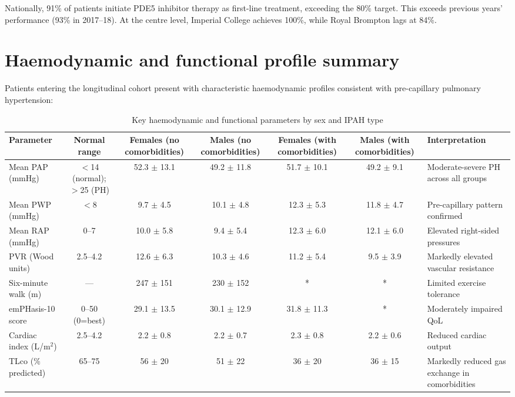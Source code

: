 \documentclass[11pt,a4paper]{article}
\begin{document}
Nationally, 91\% of patients initiate PDE5 inhibitor therapy as first-line treatment, exceeding the 80\% target. This exceeds previous years' performance (93\% in 2017--18). At the centre level, Imperial College achieves 100\%, while Royal Brompton lags at 84\%.

\section{Haemodynamic and functional profile summary}

Patients entering the longitudinal cohort present with characteristic haemodynamic profiles consistent with pre-capillary pulmonary hypertension:

\begin{table}[H]
\centering
\small
\caption{Key haemodynamic and functional parameters by sex and IPAH type}
\begin{tabularx}{\textwidth}{lcccccY}
\toprule
Parameter & Normal range & Females (no comorbidities) & Males (no comorbidities) & Females (with comorbidities) & Males (with comorbidities) & Interpretation \\
\midrule
Mean PAP (mmHg) & $<$14 (normal); $>$25 (PH) & 52.3 $\pm$ 13.1 & 49.2 $\pm$ 11.8 & 51.7 $\pm$ 10.1 & 49.2 $\pm$ 9.1 & Moderate-severe PH across all groups \\
Mean PWP (mmHg) & $<$8 & 9.7 $\pm$ 4.5 & 10.1 $\pm$ 4.8 & 12.3 $\pm$ 5.3 & 11.8 $\pm$ 4.7 & Pre-capillary pattern confirmed \\
Mean RAP (mmHg) & 0--7 & 10.0 $\pm$ 5.8 & 9.4 $\pm$ 5.4 & 12.3 $\pm$ 6.0 & 12.1 $\pm$ 6.0 & Elevated right-sided pressures \\
PVR (Wood units) & 2.5--4.2 & 12.6 $\pm$ 6.3 & 10.3 $\pm$ 4.6 & 11.2 $\pm$ 5.4 & 9.5 $\pm$ 3.9 & Markedly elevated vascular resistance \\
Six-minute walk (m) & --- & 247 $\pm$ 151 & 230 $\pm$ 152 & * & * & Limited exercise tolerance \\
emPHasis-10 score & 0--50 (0=best) & 29.1 $\pm$ 13.5 & 30.1 $\pm$ 12.9 & 31.8 $\pm$ 11.3 & * & Moderately impaired QoL \\
Cardiac index (L/m$^2$) & 2.5--4.2 & 2.2 $\pm$ 0.8 & 2.2 $\pm$ 0.7 & 2.3 $\pm$ 0.8 & 2.2 $\pm$ 0.6 & Reduced cardiac output \\
TLco (\% predicted) & 65--75 & 56 $\pm$ 20 & 51 $\pm$ 22 & 36 $\pm$ 20 & 36 $\pm$ 15 & Markedly reduced gas exchange in comorbidities \\
\bottomrule
\end{tabularx}
\end{table}
\end{document}
